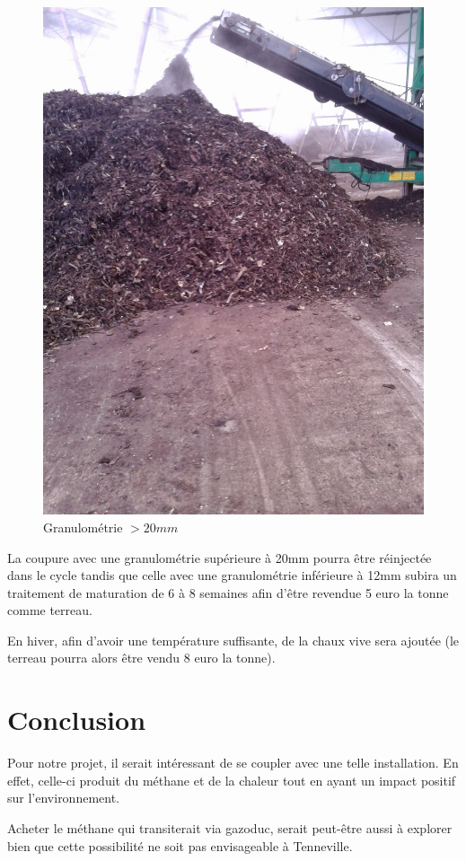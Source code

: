 \documentclass{article}
\begin{document}
\begin{figure}
  \centering
  \includegraphics[scale=0.07]{IMG_20141105_103019.jpg}
  \caption{Granulométrie $> \unit{20}{mm}$}
  \label{fig:granumore20}
\end{figure}
La coupure avec une granulométrie supérieure à \unit{20}{mm} pourra être réinjectée dans le cycle tandis que celle avec une granulométrie inférieure à \unit{12}{mm} subira un traitement de maturation de 6 à 8 semaines afin d'être revendue 5 euro la tonne comme terreau.

En hiver, afin d'avoir une température suffisante, de la chaux vive sera ajoutée (le terreau pourra alors être vendu 8 euro la tonne).
\section{Conclusion}
Pour notre projet, il serait intéressant de se coupler avec une telle installation. En effet, celle-ci produit du méthane et de la chaleur tout en ayant un impact positif sur l'environnement.

Acheter le méthane qui transiterait via gazoduc, serait peut-être aussi à explorer bien que cette possibilité ne soit pas envisageable à Tenneville.
\end{document}
